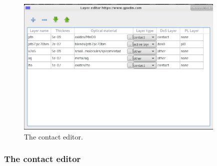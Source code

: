 \documentclass[11pt]{article}
\begin{document}
\begin{figure}[ht!]
\centering
\includegraphics[width=100mm]{./images/layer_editor.png}
{\caption{The contact editor.}}
\label{fig:layer_editor}
\end{figure}

\subsubsection{The contact editor}
\end{document}
